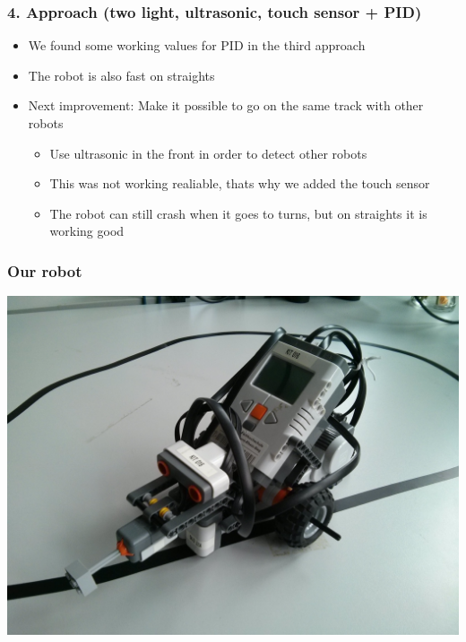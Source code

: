 \documentclass{beamer}
\begin{document}
	\begin{frame}
		\frametitle{4. Approach (two light, ultrasonic, touch sensor + PID)}
		\begin{itemize}
			\item We found some working values for PID in the third approach
			\item The robot is also fast on straights
			\item Next improvement: Make it possible to go on the same track with other robots
			\begin{itemize}
				\item Use ultrasonic in the front in order to detect other robots
				\item This was not working realiable, thats why we added the touch sensor
				\item The robot can still crash when it goes to turns, but on straights it is working good
			\end{itemize}
		\end{itemize}
	\end{frame}
	\begin{frame}
		\frametitle{Our robot}
		\includegraphics[width=\textwidth, height=\textheight, keepaspectratio]{IMG_20160922_170936.jpg}
	\end{frame}
\end{document}
